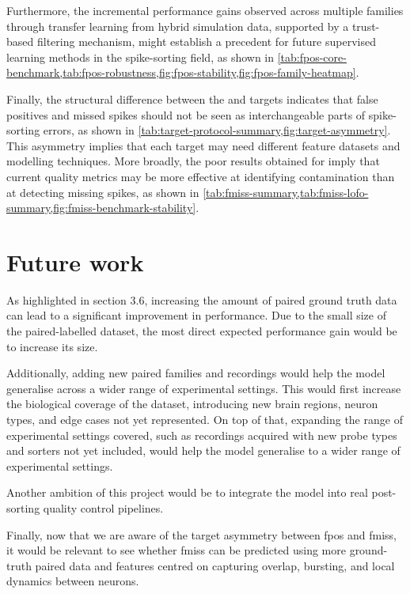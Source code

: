 Furthermore, the incremental performance gains observed across multiple families through transfer learning from hybrid simulation data, supported by a trust-based filtering mechanism, might establish a precedent for future supervised learning methods in the spike-sorting field, as shown in \cref{tab:fpos-core-benchmark,tab:fpos-robustness,fig:fpos-stability,fig:fpos-family-heatmap}.

Finally, the structural difference between the \fmiss{} and \fpos{} targets indicates that false positives and missed spikes should not be seen as interchangeable parts of spike-sorting errors, as shown in \cref{tab:target-protocol-summary,fig:target-asymmetry}. This asymmetry implies that each target may need different feature datasets and modelling techniques. More broadly, the poor results obtained for \fmiss{} imply that current quality metrics may be more effective at identifying contamination than at detecting missing spikes, as shown in \cref{tab:fmiss-summary,tab:fmiss-lofo-summary,fig:fmiss-benchmark-stability}.

\section{Future work}

As highlighted in section 3.6, increasing the amount of paired ground truth data can lead to a significant improvement in performance. Due to the small size of the paired-labelled dataset, the most direct expected performance gain would be to increase its size. 

Additionally, adding new paired families and recordings would help the model generalise across a wider range of experimental settings. This would first increase the biological coverage of the dataset, introducing new brain regions, neuron types, and edge cases not yet represented. On top of that, expanding the range of experimental settings covered, such as recordings acquired with new probe types and sorters not yet included, would help the model generalise to a wider range of experimental settings.

Another ambition of this project would be to integrate the model into real post-sorting quality control pipelines. 

Finally, now that we are aware of the target asymmetry between fpos and fmiss, it would be relevant to see whether fmiss can be predicted using more ground-truth paired data and features centred on capturing overlap, bursting, and local dynamics between neurons.

